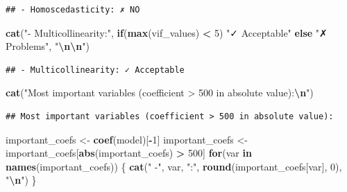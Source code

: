\documentclass[
]{article}
\newenvironment{Shaded}{\begin{snugshade}}{\end{snugshade}}
\newcommand{\ControlFlowTok}[1]{\textcolor[rgb]{0.13,0.29,0.53}{\textbf{#1}}}
\newcommand{\DecValTok}[1]{\textcolor[rgb]{0.00,0.00,0.81}{#1}}
\newcommand{\FunctionTok}[1]{\textcolor[rgb]{0.13,0.29,0.53}{\textbf{#1}}}
\newcommand{\NormalTok}[1]{#1}
\newcommand{\OtherTok}[1]{\textcolor[rgb]{0.56,0.35,0.01}{#1}}
\newcommand{\SpecialCharTok}[1]{\textcolor[rgb]{0.81,0.36,0.00}{\textbf{#1}}}
\newcommand{\StringTok}[1]{\textcolor[rgb]{0.31,0.60,0.02}{#1}}
\begin{document}
\begin{verbatim}
## - Homoscedasticity: ✗ NO
\end{verbatim}

\begin{Shaded}
\begin{Highlighting}[]
\FunctionTok{cat}\NormalTok{(}\StringTok{"{-} Multicollinearity:"}\NormalTok{, }
    \ControlFlowTok{if}\NormalTok{(}\FunctionTok{max}\NormalTok{(vif\_values) }\SpecialCharTok{\textless{}} \DecValTok{5}\NormalTok{) }\StringTok{"✓ Acceptable"} \ControlFlowTok{else} \StringTok{"✗ Problems"}\NormalTok{, }\StringTok{"}\SpecialCharTok{\textbackslash{}n\textbackslash{}n}\StringTok{"}\NormalTok{)}
\end{Highlighting}
\end{Shaded}

\begin{verbatim}
## - Multicollinearity: ✓ Acceptable
\end{verbatim}

\begin{Shaded}
\begin{Highlighting}[]
\FunctionTok{cat}\NormalTok{(}\StringTok{"Most important variables (coefficient \textgreater{} 500 in absolute value):}\SpecialCharTok{\textbackslash{}n}\StringTok{"}\NormalTok{)}
\end{Highlighting}
\end{Shaded}

\begin{verbatim}
## Most important variables (coefficient > 500 in absolute value):
\end{verbatim}

\begin{Shaded}
\begin{Highlighting}[]
\NormalTok{important\_coefs }\OtherTok{\textless{}{-}} \FunctionTok{coef}\NormalTok{(model)[}\SpecialCharTok{{-}}\DecValTok{1}\NormalTok{]}
\NormalTok{important\_coefs }\OtherTok{\textless{}{-}}\NormalTok{ important\_coefs[}\FunctionTok{abs}\NormalTok{(important\_coefs) }\SpecialCharTok{\textgreater{}} \DecValTok{500}\NormalTok{]}
\ControlFlowTok{for}\NormalTok{(var }\ControlFlowTok{in} \FunctionTok{names}\NormalTok{(important\_coefs)) \{}
  \FunctionTok{cat}\NormalTok{(}\StringTok{"  {-}"}\NormalTok{, var, }\StringTok{":"}\NormalTok{, }\FunctionTok{round}\NormalTok{(important\_coefs[var], }\DecValTok{0}\NormalTok{), }\StringTok{"}\SpecialCharTok{\textbackslash{}n}\StringTok{"}\NormalTok{)}
\NormalTok{\}}
\end{Highlighting}
\end{Shaded}
\end{document}
